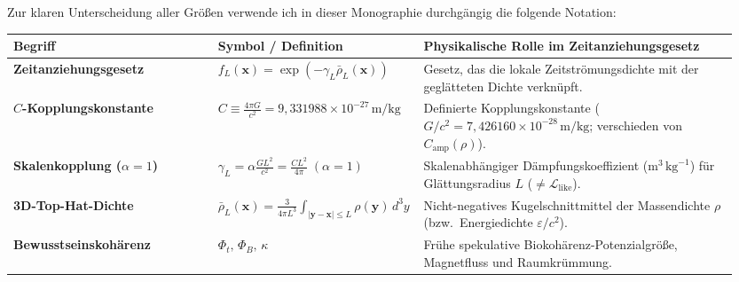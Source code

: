 \documentclass[10pt,a4paper]{article}
\begin{document}
\vspace{1.5mm}
\par
Zur klaren Unterscheidung aller Gr\"o\ss en verwende ich in dieser Monographie durchg\"angig die folgende Notation:
\begin{center}\vspace{-2pt}
{\footnotesize
\begin{tabular}{@{}>{\bfseries}p{0.28\linewidth}p{0.24\linewidth}p{0.43\linewidth}@{}}
\toprule
Begriff & Symbol / Definition & Physikalische Rolle im Zeitanziehungsgesetz \\
\midrule
Zeitanziehungsgesetz & $f_L(\mathbf{x}) = \exp(-\gamma_L \bar{\rho}_L(\mathbf{x}))$ & Gesetz, das die lokale Zeitstr\"omungsdichte mit der gegl\"atteten Dichte verkn\"upft. \\
$C$-Kopplungskonstante & $C \equiv \frac{4\pi G}{c^2} = 9{,}331988\times 10^{-27}\,\text{m/kg}$ & Definierte Kopplungskonstante ($G/c^2 = 7{,}426160\times 10^{-28}\,\text{m/kg}$; verschieden von $C_{\text{amp}}(\rho)$). \\
Skalenkopplung ($\alpha=1$) & $\gamma_L = \alpha\frac{G L^2}{c^2} = \frac{C L^2}{4\pi}\;(\alpha=1)$ & Skalenabh\"angiger D\"ampfungskoeffizient ($\text{m}^3\,\text{kg}^{-1}$) f\"ur Gl\"attungsradius $L$ ($\neq \mathcal{L}_{\text{like}}$). \\
3D-Top-Hat-Dichte & $\bar{\rho}_L(\mathbf{x}) = \frac{3}{4\pi L^3}\int_{|\mathbf{y}-\mathbf{x}|\le L}\rho(\mathbf{y})\,d^3y$ & Nicht-negatives Kugelschnittmittel der Massendichte $\rho$ (bzw.\ Energiedichte $\varepsilon/c^2$). \\
Bewusstseinskoh\"arenz & $\Phi_t,\,\Phi_B,\,\kappa$ & Fr\"uhe spekulative Biokoh\"arenz-Potenzialgr\"o\ss e, Magnetfluss und Raumkr\"ummung. \\
\bottomrule
\end{tabular}}
\end{center}
\end{document}
